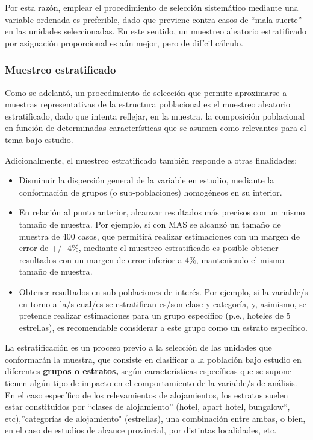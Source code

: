 \documentclass[
]{book}
\begin{document}
Por esta razón, emplear el procedimiento de selección sistemático mediante una variable ordenada es preferible, dado que previene contra casos de ``mala suerte'' en las unidades seleccionadas. En este sentido, un muestreo aleatorio estratificado por asignación proporcional es aún mejor, pero de difícil cálculo.

\hypertarget{muestreo-estratificado}{%
\subsubsection{Muestreo estratificado}\label{muestreo-estratificado}}

Como se adelantó, un procedimiento de selección que permite aproximarse a muestras representativas de la estructura poblacional es el muestreo aleatorio estratificado, dado que intenta reflejar, en la muestra, la composición poblacional en función de determinadas características que se asumen como relevantes para el tema bajo estudio.

Adicionalmente, el muestreo estratificado también responde a otras finalidades:

\begin{itemize}
\item
  Disminuir la dispersión general de la variable en estudio, mediante la conformación de grupos (o sub-poblaciones) homogéneos en su interior.
\item
  En relación al punto anterior, alcanzar resultados más precisos con un mismo tamaño de muestra. Por ejemplo, si con MAS se alcanzó un tamaño de muestra de 400 casos, que permitirá realizar estimaciones con un margen de error de +/- \(4\%\), mediante el muestreo estratificado es posible obtener resultados con un margen de error inferior a \(4\%\), manteniendo el mismo tamaño de muestra.
\item
  Obtener resultados en sub-poblaciones de interés. Por ejemplo, si la variable/s en torno a la/s cual/es se estratifican es/son clase y categoría, y, asimismo, se pretende realizar estimaciones para un grupo específico (p.e., hoteles de 5 estrellas), es recomendable considerar a este grupo como un estrato específico.
\end{itemize}

La estratificación es un proceso previo a la selección de las unidades que conformarán la muestra, que consiste en clasificar a la población bajo estudio en diferentes \textbf{grupos o estratos,} según características específicas que se supone tienen algún tipo de impacto en el comportamiento de la variable/s de análisis. En el caso específico de los relevamientos de alojamientos, los estratos suelen estar constituidos por ``clases de alojamiento'' (hotel, apart hotel, bungalow``, etc),''categorías de alojamiento" (estrellas), una combinación entre ambas, o bien, en el caso de estudios de alcance provincial, por distintas localidades, etc.
\end{document}

